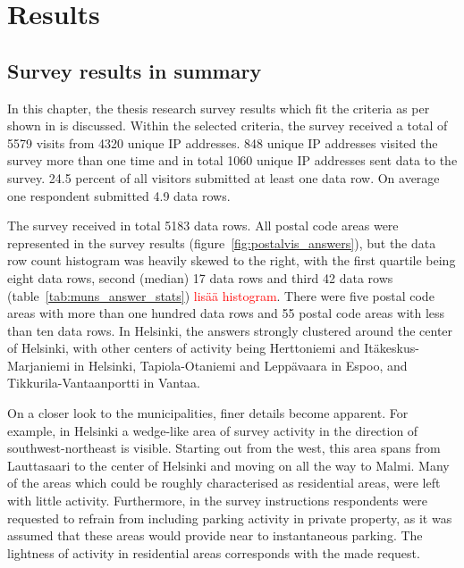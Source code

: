 \section{Results}
\subsection{Survey results in summary}
\justify

In this chapter, the thesis research survey results which fit the criteria as per shown in \hyperref[sec:processdata]{} is discussed. Within the selected criteria, the survey received a total of 5579 visits from 4320 unique IP addresses. 848 unique IP addresses visited the survey more than one time and in total 1060 unique IP addresses sent data to the survey. 24.5 percent of all visitors submitted at least one data row. On average one respondent submitted 4.9 data rows.

The survey received in total 5183 data rows. All postal code areas were represented in the survey results (figure~\ref{fig:postalvis_answers}), but the data row count histogram was heavily skewed to the right, with the first quartile being eight data rows, second (median) 17 data rows and third 42 data rows (table~\ref{tab:muns_answer_stats}) \textcolor{red}{lisää histogram}. There were five postal code areas with more than one hundred data rows and 55 postal code areas with less than ten data rows. In Helsinki, the answers strongly clustered around the center of Helsinki, with other centers of activity being Herttoniemi and Itäkeskus-Marjaniemi in Helsinki, Tapiola-Otaniemi and Leppävaara in Espoo, and Tikkurila-Vantaanportti in Vantaa.

On a closer look to the municipalities, finer details become apparent. For example, in Helsinki a wedge-like area of survey activity in the direction of southwest-northeast is visible. Starting out from the west, this area spans from Lauttasaari to the center of Helsinki and moving on all the way to Malmi. Many of the areas which could be roughly characterised as residential areas, were left with little activity. Furthermore, in the survey instructions respondents were requested to refrain from including parking activity in private property, as it was assumed that these areas would provide near to instantaneous parking. The lightness of activity in residential areas corresponds with the made request.

